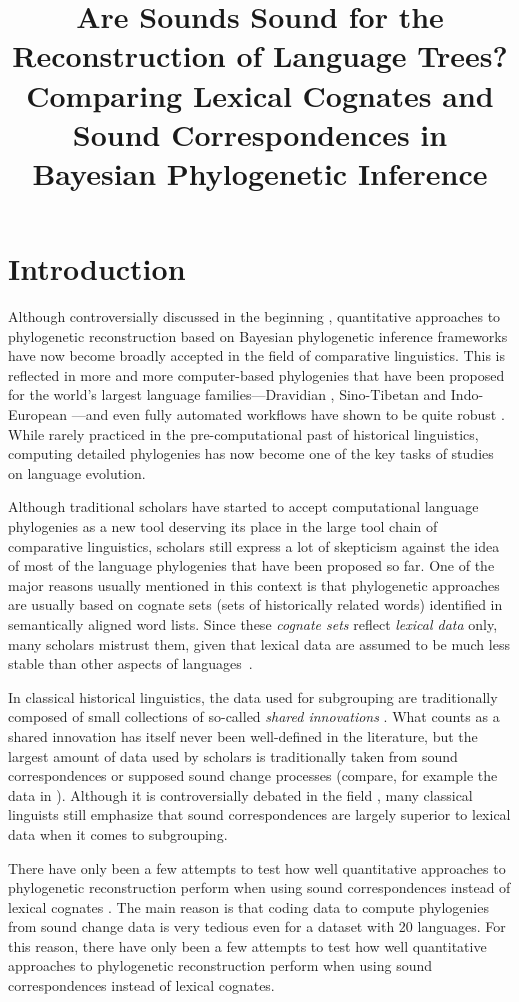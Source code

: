 \documentclass[10pt, a4paper]{article}
\title{Are Sounds Sound for the Reconstruction of Language Trees? Comparing Lexical Cognates and Sound Correspondences in Bayesian Phylogenetic Inference}
\begin{document}
\maketitleabstract%
%
\section{Introduction}

Although controversially discussed in the beginning \citep{Holm2007}, quantitative approaches to phylogenetic reconstruction based on Bayesian phylogenetic inference frameworks have now become broadly accepted in the field of comparative linguistics. This is reflected in more and more computer-based phylogenies that have been proposed for the world's largest language families---Dravidian \citep{Kolipakam2018}, Sino-Tibetan \citep{Sagart2019} and Indo-European \citep{bouckaert2012mapping}---and even fully automated workflows have shown to be quite robust \citep{rama2018automatic}.  While rarely practiced in the pre-computational past of historical linguistics, computing detailed phylogenies has now become one of the key tasks of studies on language evolution.


Although traditional scholars have started to accept computational language phylogenies as a new tool deserving its place in the large tool chain of comparative linguistics, scholars still express a lot of skepticism against the idea of most of the language phylogenies that have been proposed so far. One of the major reasons usually mentioned in this context is that phylogenetic approaches are usually based on cognate sets (sets of historically related words) identified in semantically aligned word lists. Since these \emph{cognate sets} reflect \emph{lexical data} only, many scholars mistrust them, given that lexical data are assumed to be much less stable than other aspects of languages~\cite{CampbellPoser2008}.
 
In classical historical linguistics, the data used for subgrouping are traditionally composed of small collections of so-called \emph{shared innovations} \citep{Dyen1953}. What counts as a shared innovation has itself never been well-defined in the literature, but the largest amount of data used by scholars is traditionally taken from sound correspondences or supposed sound change processes (compare, for example the data in \citealt[305]{Anttila1972}). Although it is controversially debated in the field \citep{Ringe2002,Dybo2008}, many classical linguists still emphasize that sound correspondences are largely superior to lexical data when it comes to subgrouping.

There have only been a few attempts to test how well quantitative approaches to phylogenetic reconstruction perform when using sound correspondences instead of lexical cognates \citep{Chacon2015a}. The main reason is that coding data to compute phylogenies from sound change data is very tedious even for a dataset with 20 languages.  For this reason, there have only been a few attempts to test how well quantitative approaches to phylogenetic reconstruction perform when using sound correspondences instead of lexical cognates.
\end{document}
